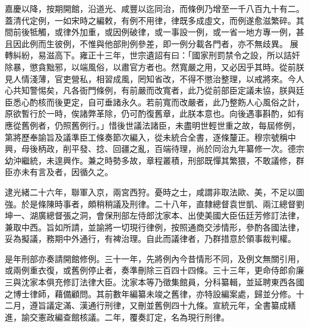 \begin{pinyinscope}
嘉慶以降，按期開館，沿道光、咸豐以迄同治，而條例乃增至一千八百九十有二。蓋清代定例，一如宋時之編敕，有例不用律，律既多成虛文，而例遂愈滋繁碎。其間前後牴觸，或律外加重，或因例破律，或一事設一例，或一省一地方專一例，甚且因此例而生彼例，不惟與他部則例參差，即一例分載各門者，亦不無歧異。展轉糾紛，易滋高下。雍正十三年，世宗遺詔有曰：「國家刑罰禁令之設，所以詰奸除暴，懲貪黜邪，以端風俗，以肅官方者也。然寬嚴之用，又必因乎其時。從前朕見人情淺薄，官吏營私，相習成風，罔知省改，不得不懲治整理，以戒將來。今人心共知警惕矣，凡各衙門條例，有前嚴而改寬者，此乃從前部臣定議未協，朕與廷臣悉心酌核而後更定，自可垂諸永久。若前寬而改嚴者，此乃整飭人心風俗之計，原欲暫行於一時，俟諸弊革除，仍可酌復舊章，此朕本意也。向後遇事斟酌，如有應從舊例者，仍照舊例行。」惜後世議法諸臣，未盡明世輕世重之故，每屆修例，第將歷奉諭旨及議準臣工條奏節次編入，從未統合全書，逐條釐正。穆宗號稱中興，母後柄政，削平發、捻、回疆之亂，百端待理，尚於同治九年纂修一次。德宗幼沖繼統，未遑興作。兼之時勢多故，章程叢積，刑部既憚其繁猥，不敢議修，群臣亦未有言及者，因循久之。

逮光緒二十六年，聯軍入京，兩宮西狩。憂時之士，咸謂非取法歐、美，不足以圖強。於是條陳時事者，頗稍稍議及刑律。二十八年，直隸總督袁世凱、兩江總督劉坤一、湖廣總督張之洞，會保刑部左侍郎沈家本、出使美國大臣伍廷芳修訂法律，兼取中西。旨如所請，並諭將一切現行律例，按照通商交涉情形，參酌各國法律，妥為擬議，務期中外通行，有裨治理。自此而議律者，乃群措意於領事裁判權。

是年刑部亦奏請開館修例。三十一年，先將例內今昔情形不同，及例文無關引用，或兩例重衣復，或舊例停止者，奏準刪除三百四十四條。三十三年，更命侍郎俞廉三與沈家本俱充修訂法律大臣。沈家本等乃徵集館員，分科纂輯，並延聘東西各國之博士律師，藉備顧問。其前數年編纂未竣之舊律，亦特設編案處，歸並分修。十二月，遵旨議定滿、漢通行刑律，又刪並舊例四十九條。宣統元年，全書纂成繕進，諭交憲政編查館核議。二年，覆奏訂定，名為現行刑律。


\end{pinyinscope}
